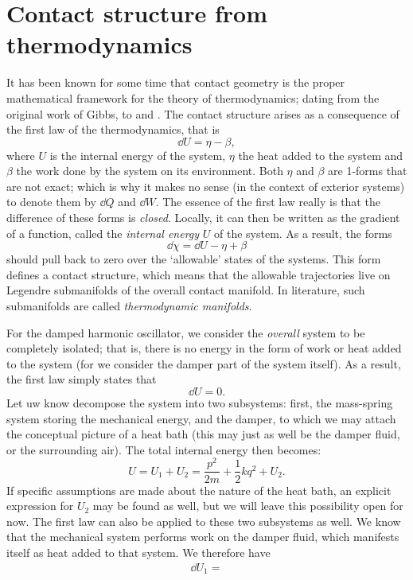 \section{Contact structure from thermodynamics}
It has been known for some time that contact geometry is the proper mathematical framework for the theory of thermodynamics; dating from the original work of Gibbs, to \citet{Arnold1989b} and \citet{Hermann1973}. The contact structure arises as a consequence of the first law of the thermodynamics, that is
\begin{equation}
    \dd{U} = \eta - \beta,
\end{equation}
where $U$ is the internal energy of the system, $\eta$ the heat added to the system and $\beta$ the work done by the system on its environment. Both $\eta$ and $\beta$ are 1-forms that are not exact; which is why it makes no sense (in the context of exterior systems) to denote them by $\dd{Q}$ and $\dd{W}$. The essence of the first law really is that the difference of these forms is \emph{closed}. Locally, it can then be written as the gradient of a function, called the \emph{internal energy} $U$ of the system. As a result, the forms 
$$ \dd{\chi} = \dd{U} - \eta + \beta $$
should pull back to zero over the `allowable' states of the systems. This form defines a contact structure, which means that the allowable trajectories live on Legendre submanifolds of the overall contact manifold. \cite{Frankel2012,Bamberg1988} In literature, such submanifolds are called \emph{thermodynamic manifolds}.

For the damped harmonic oscillator, we consider the \emph{overall} system to be completely isolated; that is, there is no energy in the form of work or heat added to the system (for we consider the damper part of the system itself). As a result, the first law simply states that
$$ \dd{U} = 0. $$
Let uw know decompose the system into two subsystems: first, the mass-spring system storing the mechanical energy, and the damper, to which we may attach the conceptual picture of a heat bath (this may just as well be the damper fluid, or the surrounding air). The total internal energy then becomes:
$$ U = U_1 + U_2 = \frac{p^2}{2m} + \frac{1}{2}kq^2 + U_2. $$
If specific assumptions are made about the nature of the heat bath, an explicit expression for $U_2$ may be found as well, but we will leave this possibility open for now. The first law can also be applied to these two subsystems as well. We know that the mechanical system performs work on the damper fluid, which manifests itself as heat added to that system. We therefore have
\begin{equation}
    \begin{split}
        \dd{U}_1 = 
    \end{split}
\end{equation}








